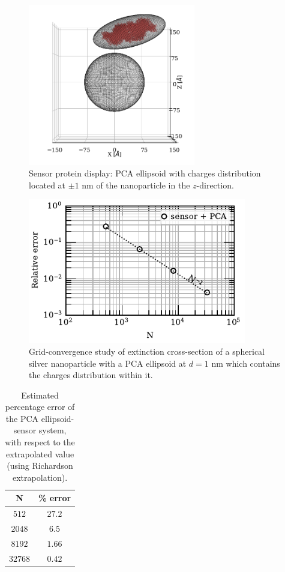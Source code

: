 \begin{figure}%
    \centering
    \includegraphics[width=0.65\textwidth]{viz/one_pca_full_display.png} 
    \caption{Sensor protein display: PCA ellipsoid with charges distribution located at $\pm 1$ nm of the 
    nanoparticle in the $z$-direction.}
    \label{fig:one_pca_sketch}
 \end{figure}


\begin{figure}%
    \centering
    \includegraphics[width=0.85\textwidth]{convergence_sensor_pca_w380.pdf} 
    \caption{Grid-convergence study of extinction cross-section of a spherical silver
             nanoparticle with a PCA ellipsoid at $d=1$ nm which contains 
             the charges distribution within it.}
    \label{fig:err_sph-pca}
 \end{figure}

 \begin{table}%
    \centering
    \caption{\label{table:err_sph-pca} Estimated percentage error of the PCA ellipsoid-sensor 
    system, with respect to the extrapolated value 
    (using Richardson extrapolation).} 
    \begin{tabular}{c c}
    \hline%
    N & \% error \\
    \hline%
     $512$ & $27.2$ \\
     $2048$ & $6.5$ \\
     $8192$ & $1.66$ \\
     $32768$ & $0.42$ \\
    \hline%
    \end{tabular}
\end{table}

